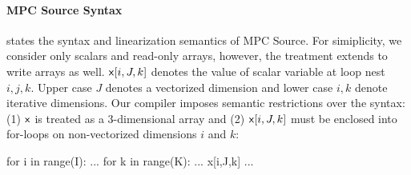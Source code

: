 \paragraph{MPC Source Syntax}

 states the syntax and linearization semantics of MPC Source. For simiplicity,
we consider only scalars and read-only arrays, however, the treatment extends to write arrays as well.
${\sf {x}}[i,J,k]$ denotes the value of scalar variable \x{} at loop nest $i,j,k$. 
Upper case $J$ denotes a vectorized dimension and lower case $i,k$ denote iterative dimensions. Our compiler imposes 
semantic restrictions over the syntax: (1) ${\sf {x}}$ is treated as a 3-dimensional array and (2) ${\sf {x}}[i,J,k]$ must be enclosed
into for-loops on non-vectorized dimensions $i$ and $k$:
\begin{pythonn}
for i in range(I):
   ...
   for k in range(K):
      ... x[i,J,k] ...
\end{pythonn}


